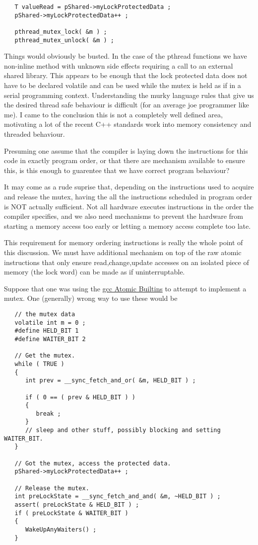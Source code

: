 \begin{lstlisting}
   T valueRead = pShared->myLockProtectedData ;
   pShared->myLockProtectedData++ ;

   pthread_mutex_lock( &m ) ;
   pthread_mutex_unlock( &m ) ;
\end{lstlisting}

Things would obviously be busted.  In the case of the pthread functions we have non-inline method with unknown side effects requiring a call to an external shared library.  This appears to be enough that the lock protected data does not have to be declared volatile and can be used while the mutex is held as if in a serial programming context.  Understanding the murky language rules that give us the desired thread safe behaviour is difficult (for an average joe programmer like me).  I came to the conclusion this is not a completely well defined area, motivating a lot of the recent C++ standards work into memory consistency and threaded behaviour.

Presuming one assume that the compiler is laying down the instructions for this code in exactly program order, or that there are mechanism available to ensure this, is this enough to guarentee that we have correct program behaviour?

It may come as a rude suprise that, depending on the instructions used to acquire and release the mutex, having the all the instructions scheduled in program order is NOT actually sufficient.  Not all hardware executes instructions in the order the compiler specifies, and we also need mechanisms to prevent the hardware from starting a memory access too early or letting a memory access complete too late.

This requirement for memory ordering instructions is really the whole point of this discussion.  We must have additional mechanism on top of the raw atomic instructions that only ensure read,change,update accesses on an isolated piece of memory (the lock word) can be made as if uninterruptable.

Suppose that one was using the \href{http://gcc.gnu.org/onlinedocs/gcc-4.1.2/gcc/Atomic-Builtins.html}{gcc Atomic Builtins} to attempt to implement a mutex.  One (generally) wrong way to use these would be

\begin{lstlisting}
   // the mutex data
   volatile int m = 0 ;
   #define HELD_BIT 1
   #define WAITER_BIT 2

   // Get the mutex.
   while ( TRUE )
   {
      int prev = __sync_fetch_and_or( &m, HELD_BIT ) ;

      if ( 0 == ( prev & HELD_BIT ) )
      {
         break ;
      }
      // sleep and other stuff, possibly blocking and setting WAITER_BIT.
   }

   // Got the mutex, access the protected data.
   pShared->myLockProtectedData++ ;

   // Release the mutex.
   int preLockState = __sync_fetch_and_and( &m, ~HELD_BIT ) ;
   assert( preLockState & HELD_BIT ) ;
   if ( preLockState & WAITER_BIT )
   {
      WakeUpAnyWaiters() ;
   }
\end{lstlisting} 

